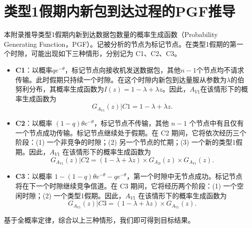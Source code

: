 \chapter{类型1假期内新包到达过程的PGF推导}
\label{app:proof_lemma1}

本附录推导类型1假期内新到达数据包数量的概率生成函数（Probability Generating Function，PGF）。记被分析的节点为标记节点。在类型1假期的第一个时隙，可能出现如下三种情形，分别记为 C1、C2、C3。

\begin{itemize}
	\item \textbf{C1}：以概率$qe^{-\theta}$，标记节点向接收机发送数据包，其他$n-1$个节点均不请求传输。此时假期只持续一个时隙。在这个时隙内新包到达量服从参数为$\lambda$的伯努利分布，其概率生成函数为$I(z)=1-\lambda+\lambda z$。因此，$A_{V1}$在该情形下的概率生成函数为
	\begin{equation}
		G_{A_{V1}}(z)|C1 = 1 - \lambda + \lambda z.
	\end{equation}
	
	\item \textbf{C2}：以概率 $(1-q)\theta e^{-\theta}$，标记节点不传输，其他 $n-1$ 个节点中有且仅有一个节点成功传输。标记节点继续处于假期。在 C2 期间，它将依次经历三个阶段：(1) 一个非竞争的时隙；(2) 另一个节点的忙期；(3) 一个新的类型1假期。因此，$A_{V1}$ 在该情形下的概率生成函数为
	\begin{equation}
		G_{A_{V1}}(z)|C2 = (1 - \lambda + \lambda z) \times G_{A_{B}}(z) \times G_{A_{V1}}(z).
	\end{equation}
	
	\item \textbf{C3}：以概率 $1-(1-q)\theta e^{-\theta}-qe^{-\theta}$，第一个时隙中无节点成功。标记节点将在下一个时隙继续竞争信道。在 C3 期间，它将经历两个阶段：(1) 一个空闲时隙；(2) 一个类型1假期。因此，$A_{V1}$ 在该情形下的概率生成函数为
	\begin{equation}
		G_{A_{V1}}(z)|C3 = (1 - \lambda + \lambda z) \times G_{A_{V1}}(z).
	\end{equation}
\end{itemize}

基于全概率定律，综合以上三种情形，我们即可得到目标结果。
